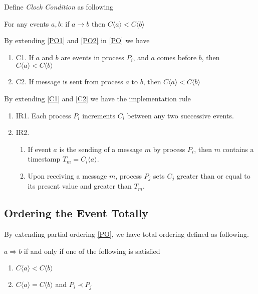 \documentclass[12pt,a4paper,oneside]{article}
\begin{document}
Define \textit{Clock Condition} as following

\medskip

For any events $a, b$: if $a \rightarrow b$ then $C\langle a \rangle < C\langle b \rangle$

\medskip

By extending \ref{PO1} and \ref{PO2} in \ref{PO} we have

\begin{enumerate}
  \item \label{C1} C1. If $a$ and $b$ are events in process $P_i$, and $a$ comes before $b$, then $C\langle a \rangle < C\langle b \rangle$\cite{l}
  \item \label{C2} C2. If message is sent from process $a$ to $b$, then $C\langle a \rangle < C\langle b \rangle$\
\end{enumerate}

By extending \ref{C1} and \ref{C2} we have the implementation rule

\begin{enumerate}
  \item \label{IR1} IR1. Each process $P_i$ increments $C_i$ between any two successive events\cite{l}.
  \item \label{IR2} IR2.
  \begin{enumerate}
    \item If event $a$ is the sending of a message $m$ by process $P_i$, then $m$ contains a timestamp $T_m=C_i\langle a \rangle$\cite{l}.
    \item Upon receiving a message $m$, process $P_j$ sets $C_j$ greater than or equal to its present value and greater than $T_m$\cite{l}.
  \end{enumerate}
\end{enumerate}

\subsection{Ordering the Event Totally} \label{TO}

By extending partial ordering \ref{PO}, we have total ordering defined as following.

\medskip

$a \Rightarrow b$ if and only if one of the following is satisfied

\begin{enumerate}
  \item $C\langle a \rangle < C\langle b \rangle$
  \item $C\langle a \rangle = C\langle b \rangle$ and $P_i \prec P_j$
\end{enumerate}
\end{document}
